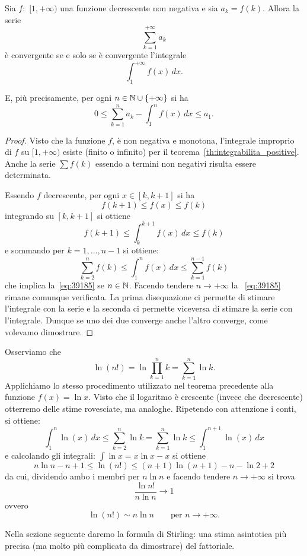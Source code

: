 \begin{theorem}
\mymark{**}
Sia $f\colon$ $[1,+\infty)$ una funzione decrescente non negativa
e sia $a_k=f(k)$.
Allora la serie
\[
   \sum_{k=1}^{+\infty} a_k
\]
è convergente se e solo se è convergente l'integrale
\[
  \int_1^{+\infty} f(x)\, dx.
\]

E, più precisamente, per ogni $n\in \mathbb N\cup\{+\infty\}$ si ha
\begin{equation}\label{eq:39185}
  0
  \le \sum_{k=1}^{n} a_k - \int_1^{n}f(x)\, dx
  \le a_1.
\end{equation}

\end{theorem}
%
\begin{proof}
\mymark{**}
Visto che la funzione $f$, è non negativa e monotona,
l'integrale improprio di $f$ su $[1,+\infty)$ esiste (finito o infinito)
per il teorema~\ref{th:integrabilita_positive}.
Anche la serie $\sum f(k)$ essendo a termini non negativi risulta essere determinata.

Essendo $f$ decrescente, per ogni $x \in [k,k+1]$ si ha
\[
  f(k+1) \le f(x) \le f(k)
\]
integrando su $[k,k+1]$ si ottiene
\[
  f(k+1) \le \int_{k}^{k+1} f(x)\, dx \le f(k)
\]
e sommando per $k=1,\dots, n-1$ si ottiene:
\[
  \sum_{k=2}^{n} f(k) \le \int_{1}^{n} f(x)\, dx \le \sum_{k=1}^{n-1} f(k)
\]
che implica la~\eqref{eq:39185} se $n\in \mathbb N$. Facendo
tendere $n\to+\infty$ la ~\eqref{eq:39185} rimane comunque verificata.
La prima disequazione ci permette di stimare l'integrale con la serie
e la seconda ci permette viceversa di stimare la serie con l'integrale.
Dunque se uno dei due converge anche l'altro converge, come volevamo dimostrare.
\end{proof}

\begin{example}
\label{ex:498124}%
%
%
Osserviamo che
\[
  \ln (n!) = \ln \prod_{k=1}^n k = \sum_{k=1}^n \ln k.
\]
Applichiamo lo stesso procedimento utilizzato nel teorema precedente alla
funzione $f(x) = \ln x$. Visto che il logaritmo è crescente
(invece che decrescente) otterremo delle stime rovesciate, ma analoghe.
 Ripetendo con attenzione i conti, si ottiene:
\[
    \int_1^n \ln(x)\, dx \le  \sum_{k=2}^n \ln k = \sum_{k=1}^n \ln k \le \int_1^{n+1} \ln(x) \, dx
\]
e calcolando gli integrali: $\int \ln x = x \ln x -x$ si ottiene
\[
  n \ln n - n + 1 \le \ln(n!) \le (n+1) \ln (n+1) - n - \ln 2 +2
\]
da cui, dividendo ambo i membri per $n \ln n$ e facendo tendere $n\to +\infty$ si trova
\[
 \frac{\ln n!}{n \ln n}\to 1
\]
ovvero
\[
  \ln (n!) \sim n \ln n \qquad \text{per $n\to +\infty$.}
\]

Nella sezione seguente daremo la formula di Stirling: una stima asintotica più
precisa (ma molto più complicata
da dimostrare) del fattoriale.
\end{example}

